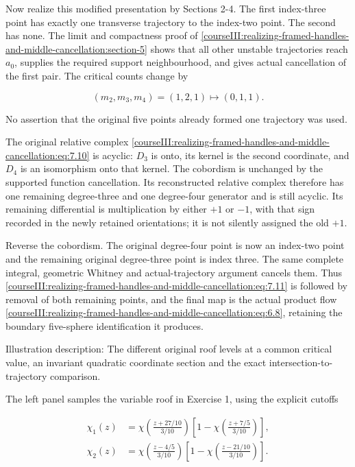 Now realize this modified presentation by Sections 2-4. The first index-three point has exactly one transverse trajectory to the index-two point. The second has none. The limit and compactness proof of \cref{courseIII:realizing-framed-handles-and-middle-cancellation:section-5} shows that all other unstable trajectories reach \(a_0\), supplies the required support neighbourhood, and gives actual cancellation of the first pair. The critical counts change by

\begin{equation}
(m_2,m_3,m_4)=(1,2,1)\longmapsto(0,1,1).
 \label{courseIII:realizing-framed-handles-and-middle-cancellation:eq:7.11}
\end{equation}

No assertion that the original five points already formed one trajectory was used.

The original relative complex \eqref{courseIII:realizing-framed-handles-and-middle-cancellation:eq:7.10} is acyclic: \(D_3\) is onto, its kernel is the second coordinate, and \(D_4\) is an isomorphism onto that kernel. The cobordism is unchanged by the supported function cancellation. Its reconstructed relative complex therefore has one remaining degree-three and one degree-four generator and is still acyclic. Its remaining differential is multiplication by either \(+1\) or \(-1\), with that sign recorded in the newly retained orientations; it is not silently assigned the old \(+1\).

Reverse the cobordism. The original degree-four point is now an index-two point and the remaining original degree-three point is index three. The same complete integral, geometric Whitney and actual-trajectory argument cancels them. Thus \eqref{courseIII:realizing-framed-handles-and-middle-cancellation:eq:7.11} is followed by removal of both remaining points, and the final map is the actual product flow \eqref{courseIII:realizing-framed-handles-and-middle-cancellation:eq:6.8}, retaining the boundary five-sphere identification it produces.

Illustration description: The different original roof levels at a common critical value, an invariant quadratic coordinate section and the exact intersection-to-trajectory comparison.

The left panel samples the variable roof in Exercise 1, using the explicit cutoffs

\begin{equation}
\begin{aligned}
 \chi_1(z)&=\chi\left(\frac{z+27/10}{3/10}\right)
       \left[1-\chi\left(\frac{z+7/5}{3/10}\right)\right],\\
 \chi_2(z)&=\chi\left(\frac{z-4/5}{3/10}\right)
       \left[1-\chi\left(\frac{z-21/10}{3/10}\right)\right].
 \end{aligned}
 \label{courseIII:realizing-framed-handles-and-middle-cancellation:eq:7.12}
\end{equation}

